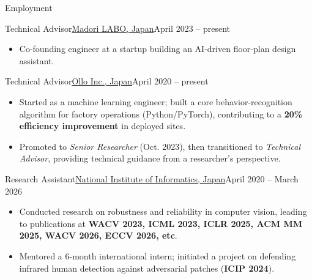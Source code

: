 \documentclass[]{mcdowellcv}
\begin{document}
\begin{cvsection}{Employment}
  \begin{cvsubsection}{Technical Advisor}{\href{https://madori-labo.com}{Madori LABO, Japan}}{April 2023 -- present}
    \begin{itemize}
      \item Co-founding engineer at a startup building an AI-driven floor-plan design assistant.
    \end{itemize}
  \end{cvsubsection}

  \begin{cvsubsection}{Technical Advisor}{\href{https://ollo.jp/}{Ollo Inc., Japan}}{April 2020 -- present}
    \begin{itemize}
      \item Started as a machine learning engineer; built a core behavior-recognition algorithm for factory operations (Python/PyTorch), contributing to a \textbf{20\% efficiency improvement} in deployed sites.
      \item Promoted to \textit{Senior Researcher} (Oct. 2023), then transitioned to \textit{Technical Advisor}, providing technical guidance from a researcher's perspective.
    \end{itemize}
  \end{cvsubsection}

  \begin{cvsubsection}{Research Assistant}{\href{https://www.nii.ac.jp/en/}{National Institute of Informatics, Japan}}{April 2020 -- March 2026}
    \begin{itemize}
      \item Conducted research on robustness and reliability in computer vision, leading to publications at \textbf{WACV 2023, ICML 2023, ICLR 2025, ACM MM 2025, WACV 2026, ECCV 2026, etc}.
      \item Mentored a 6-month international intern; initiated a project on defending infrared human detection against adversarial patches (\textbf{ICIP 2024}).
    \end{itemize}
  \end{cvsubsection}

\end{cvsection}

\end{document}
